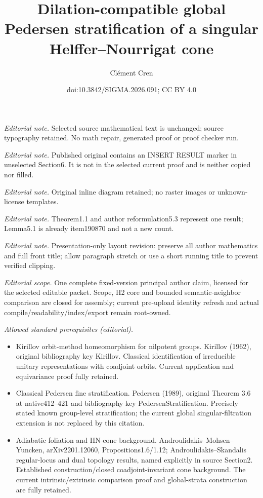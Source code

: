 \documentclass[10pt,a4paper]{article}
\title{Dilation-compatible global Pedersen stratification of a singular Helffer–Nourrigat cone}
\author{Clément Cren}
\date{doi:10.3842/SIGMA.2026.091; CC BY 4.0}
\numberwithin{equation}{section}
\theoremstyle{definition}
\begin{document}
\maketitle
\noindent\textit{Editorial note.} Selected source mathematical text is unchanged; source typography retained. No math repair, generated proof or proof checker run.\par\medskip
\noindent\textit{Editorial note.} Published original contains an INSERT RESULT marker in unselected Section6. It is not in the selected current proof and is neither copied nor filled.\par\medskip
\noindent\textit{Editorial note.} Original inline diagram retained; no raster images or unknown-license templates.\par\medskip
\noindent\textit{Editorial note.} Theorem1.1 and author reformulation5.3 represent one result; Lemma5.1 is already item190870 and not a new count.\par\medskip
\noindent\textit{Editorial note.} Presentation-only layout revision: preserve all author mathematics and full front title; allow paragraph stretch or use a short running title to prevent verified clipping.\par\medskip
\noindent\textit{Editorial scope.} One complete fixed-version principal author claim, licensed for the selected editable packet. Scope, H2 core and bounded semantic-neighbor comparison are closed for assembly; current pre-upload identity refresh and actual compile/readability/index/export remain root-owned.\par\medskip
\noindent\textit{Allowed standard prerequisites (editorial).}\begin{itemize}
\item Kirillov orbit-method homeomorphism for nilpotent groups. Kirillov (1962), original bibliography key Kirillov. Classical identification of irreducible unitary representations with coadjoint orbits. Current application and equivariance proof fully retained.
\item Classical Pedersen fine stratification. Pedersen (1989), original Theorem 3.6 at native412–421 and bibliography key PedersenStratification. Precisely stated known group-level stratification; the current global singular-filtration extension is not replaced by this citation.
\item Adiabatic foliation and HN-cone background. Androulidakis–Mohsen–Yuncken, arXiv2201.12060, Propositions1.6/1.12; Androulidakis–Skandalis regular-locus and dual topology results, named explicitly in source Section2. Established construction/closed coadjoint-invariant cone background. The current intrinsic/extrinsic comparison proof and global-strata construction are fully retained.
\end{itemize}\medskip
\end{document}
